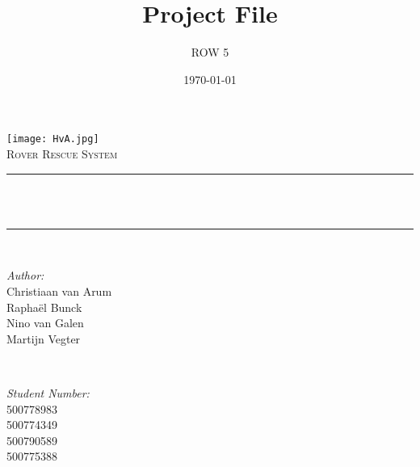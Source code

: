 \title{Project File}
\author{ROW 5}
\date{\today}

\makeatletter
\let\thetitle\@title
\let\theauthor\@author
\let\thedate\@date
\makeatother

\pagestyle{fancy}
\fancyhf{}
\rhead{\theauthor}
\lhead{\thetitle}
\cfoot{\thepage}


	\begin{titlepage}
		\centering
		\vspace*{0.5 cm}
		\texttt{[image: HvA.jpg]}\\[1.0 cm]
		\textsc{\Large Rover Rescue System}\\[0.5 cm]
		\rule{\linewidth}{0.2 mm} \\[0.4 cm]
		{ \huge \bfseries \thetitle}\\
		\rule{\linewidth}{0.2 mm} \\[1.5 cm]
		
		\begin{minipage}{0.4\textwidth}
			\begin{flushleft} \large
				\emph{Author:}\\
				Christiaan van Arum\\
				Rapha\"el Bunck\\
				Nino van Galen\\
				Martijn Vegter
			\end{flushleft}
		\end{minipage}~
		\begin{minipage}{0.4\textwidth}
			\begin{flushright} \large
				\emph{Student Number:} \\
				500778983\\ %
				500774349\\ %
				500790589\\ %
				500775388	%
			\end{flushright}
		\end{minipage}\\[2 cm]
		
		{\large \thedate}\\[2 cm]
		
		\vfill
		
	\end{titlepage}
